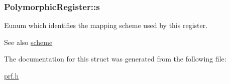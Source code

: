 \subsubsection[{s}]{ Polymorphic\+Register\+::s}\label{struct_polymorphic_register_a50360b225a043d149cd0b4e6ac4fdc05}


Eunum which identifies the mapping scheme used by this register. 

\begin{DoxySeeAlso}{See also}
\hyperlink{prf_8h_a1a1ed40592bd51f9b25af65953320968}{scheme} 
\end{DoxySeeAlso}


The documentation for this struct was generated from the following file\+:\begin{DoxyCompactItemize}
\item 
\hyperlink{prf_8h}{prf.\+h}\end{DoxyCompactItemize}
